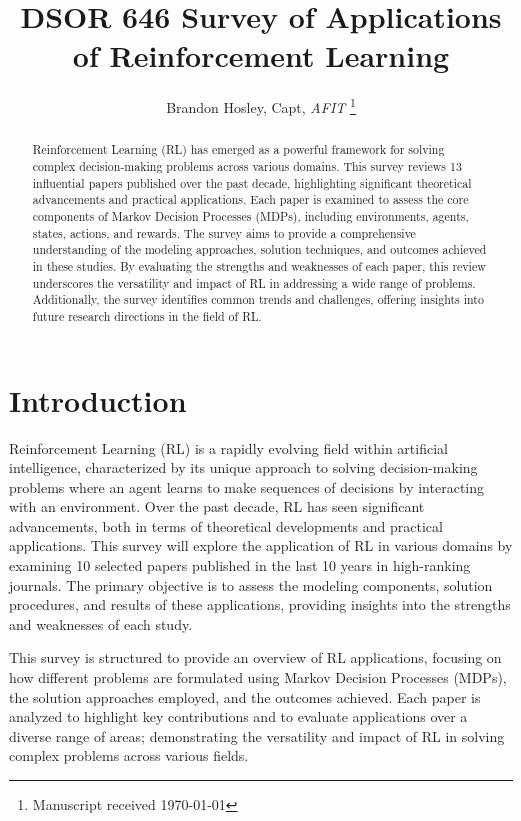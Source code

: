 \documentclass[journal]{IEEEtran}
\title{DSOR 646 Survey of Applications of Reinforcement Learning}
\author{Brandon Hosley, Capt, \textit{AFIT}%
    \thanks{Manuscript received \today%
}}
\begin{document}
\maketitle
\begin{abstract}
Reinforcement Learning (RL) has emerged as a powerful framework for solving complex 
decision-making problems across various domains. This survey reviews 13 influential papers 
published over the past decade, highlighting significant theoretical advancements and 
practical applications. Each paper is examined to assess the core components of 
Markov Decision Processes (MDPs), including environments, agents, states, actions, and rewards. 
The survey aims to provide a comprehensive understanding of the modeling approaches, 
solution techniques, and outcomes achieved in these studies. 
By evaluating the strengths and weaknesses of each paper, this review underscores the 
versatility and impact of RL in addressing a wide range of problems. 
Additionally, the survey identifies common trends and challenges, 
offering insights into future research directions in the field of RL.
\end{abstract}
\section{Introduction}
\label{sec:introduction}

Reinforcement Learning (RL) is a rapidly evolving field within artificial intelligence, 
characterized by its unique approach to solving decision-making problems where an agent 
learns to make sequences of decisions by interacting with an environment. 
Over the past decade, RL has seen significant advancements, 
both in terms of theoretical developments and practical applications. 
This survey will explore the application of RL in various domains by examining 10 
selected papers published in the last 10 years in high-ranking journals. 
The primary objective is to assess the modeling components, solution procedures, and results 
of these applications, providing insights into the strengths and weaknesses of each study.

This survey is structured to provide an overview of RL applications, focusing on how 
different problems are formulated using Markov Decision Processes (MDPs), 
the solution approaches employed, and the outcomes achieved. Each paper is analyzed to 
highlight key contributions and to evaluate applications over a diverse range of areas; 
demonstrating the versatility and impact of RL in solving complex problems across various fields.
\end{document}
